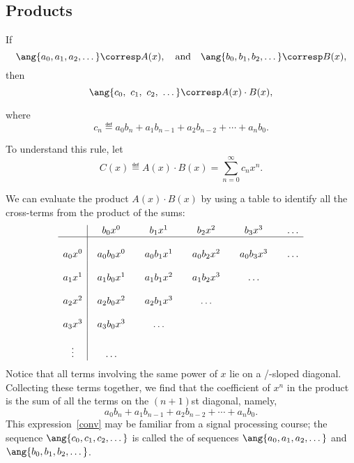 \subsection{Products}

\begin{mathrule}
\label{rule:product}
If
%
\[
\ang{a_0, a_1, a_2, \dots} \corresp A(x),\quad \text{and}\quad
\ang{b_0, b_1, b_2, \dots} \corresp B(x),
\]
%
then
%
\[
\ang{c_0,\ c_1 ,\ c_2,\ \dots} \corresp A(x) \cdot B(x),
\]
\end{mathrule}
where
\[
c_n \eqdef a_0 b_n + a_1 b_{n-1} + a_2 b_{n-2} + \cdots + a_n b_0.
\]

To understand this rule, let
\[
C(x) \eqdef A(x) \cdot B(x) = \sum_{n=0}^{\infty} c_n x^n.
\]

We can evaluate the product $A(x) \cdot B(x)$ by using a table to identify
all the cross-terms from the product of the sums:
%
\[
\begin{array}{c|@{\quad}c@{\qquad}c@{\qquad}c@{\qquad}c@{\qquad}c}
        & b_0 x^0 & b_1 x^1 & b_2 x^2 & b_3 x^3 & \dots \\
\hline
\\
a_0 x^0 & a_0 b_0 x^0 & a_0 b_1 x^1 & a_0 b_2 x^2 & a_0 b_3 x^3 & \dots \\
\\
a_1 x^1 & a_1 b_0 x^1 & a_1 b_1 x^2 & a_1 b_2 x^3 & \dots \\
\\
a_2 x^2 & a_2 b_0 x^2 & a_2 b_1 x^3 & \dots \\
\\
a_3 x^3 & a_3 b_0 x^3 & \dots \\
\\
\vdots & \dots\\
\end{array}
\]
%
Notice that all terms involving the same power of $x$ lie on a
/-sloped diagonal.  Collecting these terms together, we find that the
coefficient of $x^n$ in the product is the sum of all the terms on the
$(n+1)$st diagonal, namely,
\begin{equation}\label{conv}
a_0 b_n + a_1 b_{n-1} + a_2 b_{n-2} + \cdots + a_n b_0.
\end{equation}
This expression~\eqref{conv} may be familiar from a signal processing
course; the sequence $\ang{c_0, c_1, c_2, \dots}$ is called the
 of sequences $\ang{a_0, a_1, a_2, \dots}$ and
$\ang{b_0, b_1, b_2, \dots}$.

\label{sec:fibonacci}

